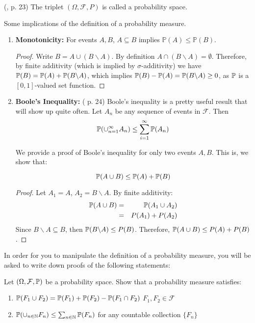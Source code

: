\documentclass[11pt]{article} %
\begin{document}
\begin{definition} (\cite{Billingsley95}, p. 23)
The triplet $(\Omega, \mathcal{F}, P)$ is called a probability space. 
\end{definition}

Some implications of the definition of a probability measure. 

\begin{enumerate}

\item \textbf{Monotonicity:} For events $A,B$, $A \subseteq B$ implies $\mathbb{P}(A) \leq \mathbb{P}(B)$.

\begin{proof}
Write $B= A \cup (B \backslash A)$. By definition $A \cap (B\backslash A)=\emptyset$. Therefore, by finite additivity (which is implied by $\sigma$-additivity) we have $\mathbb{P}(B)=\mathbb{P}(A) + \mathbb{P}(B \backslash A)$, which implies $\mathbb{P}(B)-\mathbb{P}(A)= \mathbb{P}(B \backslash A) \geq 0$, as $\mathbb{P}$ is a $[0,1]$-valued set function.  
\end{proof}

\item \textbf{Boole's Inequality:} (\cite{Billingsley95} p. 24) Boole's inequality is a pretty useful result that will show up quite often.  Let $A_n$ be any sequence of events in $\mathcal{F}$. Then
$$\mathbb{P}(\cup_{n=1}^{\infty} A_n) \leq \sum_{i=1}^{\infty} \mathbb{P}(A_n)  $$

We provide a proof of Boole's inequality for only two events $A,B$. This is, we show that:

$$\mathbb{P}(A \cup B) \leq \mathbb{P}(A) + \mathbb{P}(B) $$

\begin{proof}
Let $A_1=A$, $A_2=B \backslash A$. By finite additivity:
\begin{eqnarray*}
\mathbb{P}(A \cup B) &=& \mathbb{P}(A_1 \cup A_2)\\
&=& P(A_1) + P(A_2)   
\end{eqnarray*}
Since $B \backslash A \subseteq B$, then $\mathbb{P}(B\backslash A) \leq P(B)$. Therefore, $\mathbb{P}(A \cup B) \leq P(A) + P(B)$. 
\end{proof}

\end{enumerate}

In order for you to manipulate the definition of a probability measure, you will be asked to write down proofs of the following statements:\\

\noindent\begin{prproblem} Let $(\Omega, \mathcal{F}, \mathbb{P})$ be a probability space. Show that a probability measure satisfies:
\begin{enumerate}
\item $\mathbb{P}(F_1 \cup F_2) = \mathbb{P}(F_1) + \mathbb{P}(F_2) - \mathbb{P}(F_1 \cap F_2)$  $F_1,F_2 \in \mathcal{F}$
\item $\mathbb{P}(\cup_{n \in \mathbb{N}} F_n) \leq \sum_{n \in \mathbb{N}} \mathbb{P}(F_n) $ for any countable collection $\{F_n\}$
\end{enumerate}
\end{prproblem}
\end{document}
